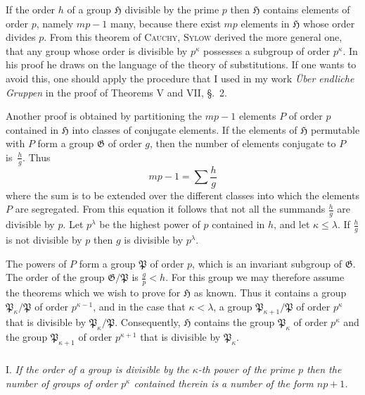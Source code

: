 \documentclass[a5paper,12pt]{article}
\newcommand{\secformat}[1]{\centering{\normalfont\normalsize{#1}}}
\let\fr\mathfrak
\newcommand{\CG}{\fr{G}}
\newcommand{\CH}{\fr{H}}
\newcommand{\CP}{\fr{P}}
\newcommand{\?}{{\color{blue}${}^{(?)}$}}
\newcounter{origpagecounter}{}
\newcommand{\origpagebreak}{\mark{\arabic{origpagecounter}}\addtocounter{origpagecounter}{1}\mark{\arabic{origpagecounter}}}
\begin{document}
If the order $h$ of a group $\CH$ divisible by the prime $p$
then
$\CH$ contains elements of order $p$,
namely $m p - 1$ many,
because there exist $m p$ elements in $\CH$
whose order divides $p$.
%
%
From this theorem of \textsc{Cauchy},
\textsc{Sylow}
derived the more general one,
that
any group whose order is divisible by $p^\kappa$
possesses
a subgroup of order $p^\kappa$.
%
%
In his proof he draws on
the language of the theory of substitutions.
%
%
If one wants to avoid this,
one should apply the procedure
that I used
in my work
\emph{\"Uber endliche Gruppen}
in the proof of 
Theorems V and VII, \S.~2.


Another proof is obtained
by partitioning
the $m p - 1$ elements $P$ of order $p$ contained in $\CH$ 
into classes of conjugate elements.
%
%
If the elements of $\CH$ permutable with $P$
form a group $\CG$ of order $g$,
then
the number of elements conjugate to $P$ is~$\frac{h}{g}$.
%
%
Thus
\[
	m p - 1
	=
	\sum \frac{h}{g}
\]
where the sum is to be extended
over the different classes
into which the elements $P$ are segregated.
%
%
From this equation it follows
that
not all the summands $\frac{h}{g}$
are divisible by $p$.
%
%
Let $p^\lambda$ be the highest power of $p$ contained in $h$,
and
let $\kappa \leq \lambda$.
%
%
If $\frac{h}{g}$ is not divisible by $p$
then $g$ is divisible by $p^\lambda$.
%
%
\origpagebreak
%
%
The powers of $P$ form a group $\CP$ of order $p$,
which is an invariant subgroup of $\CG$.
%
%
The order of the group $\CG / \CP$ is $\frac{g}{p} < h$.
%
%
For this group we may therefore
assume the theorems
which we wish to prove for $\CH$ as known.
%
%
Thus it contains 
a group $\CP_\kappa / \CP$
of order $p^{\kappa - 1}$,
and in the case that $\kappa < \lambda$,
a group $\CP_{\kappa+1} / \CP$ of order $p^\kappa$
that is divisible by $\CP_\kappa / \CP$.
%
%
Consequently,
$\CH$ contains the group $\CP_\kappa$ of order $p^\kappa$
and the group $\CP_{\kappa+1}$ of order $p^{\kappa+1}$
that is divisible by $\CP_\kappa$.


\subsubsection*{\secformat{\S.~4.}}

I.
%
\label{t:4-1}
%
\emph{ %
If the order of a group is divisible by 
the $\kappa$-th power of the prime $p$
then
the number of groups of order $p^\kappa$
contained therein
is a number of the form $n p + 1$.
}
\end{document}
